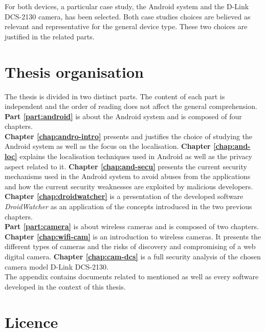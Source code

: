 For both devices, a particular case study, the Android system and the D-Link DCS-2130 camera, has been selected.
Both case studies choices are believed as relevant and representative for the general device type.
These two choices are justified in the related parts.


\section{Thesis organisation}

The thesis is divided in two distinct parts.
The content of each part is independent and the order of reading does not affect the general comprehension.\\

\textbf{Part \ref{part:android}} is about the Android system and is composed of four chapters.\\

\textbf{Chapter \ref{chap:andro-intro}} presents and justifies the choice of studying the Android system as well as the focus on the localisation.
\textbf{Chapter \ref{chap:and-loc}} explains the localisation techniques used in Android as well as the privacy aspect related to it.
\textbf{Chapter \ref{chap:and-secu}} presents the current security mechanisms used in the Android system to avoid abuses from the applications and how the current security weaknesses are exploited by malicious developers.
\textbf{Chapter \ref{chap:droidwatcher}} is a presentation of the developed software \emph{DroidWatcher} as an application of the concepts introduced in the two previous chapters.\\

\textbf{Part \ref{part:camera}} is about wireless cameras and is composed of two chapters.\\

\textbf{Chapter \ref{chap:wifi-cam}} is an introduction to wireless cameras.
It presents the different types of cameras and the risks of discovery and compromising of a web digital camera.
\textbf{Chapter \ref{chap:cam-dcs}} is a full security analysis of the chosen camera model D-Link DCS-2130.\\

The appendix contains documents related to mentioned as well as every software developed in the context of this thesis.

\section{Licence}

